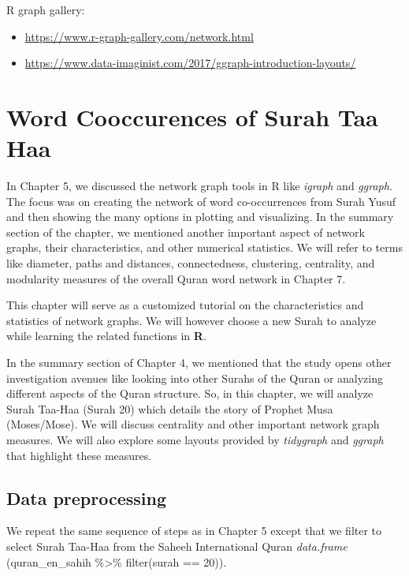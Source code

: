 \documentclass[
]{article}
\providecommand{\tightlist}{%
  \setlength{\itemsep}{0pt}\setlength{\parskip}{0pt}}
\begin{document}
R graph gallery:

\begin{itemize}
\tightlist
\item
  \url{https://www.r-graph-gallery.com/network.html}
\item
  \url{https://www.data-imaginist.com/2017/ggraph-introduction-layouts/}
\end{itemize}

\hypertarget{word-coccurrences-of-Surah-Taa-Haa}{%
\section{Word Cooccurences of Surah Taa Haa}\label{word-coccurrences-of-Surah-Taa-Haa}}

In Chapter 5, we discussed the network graph tools in R like \emph{igraph} and \emph{ggraph}. The focus was on creating the network of word co-occurrences from Surah Yusuf and then showing the many options in plotting and visualizing. In the summary section of the chapter, we mentioned another important aspect of network graphs, their characteristics, and other numerical statistics. We will refer to terms like diameter, paths and distances, connectedness, clustering, centrality, and modularity measures of the overall Quran word network in Chapter 7.

This chapter will serve as a customized tutorial on the characteristics and statistics of network graphs. We will however choose a new Surah to analyze while learning the related functions in \textbf{R}.

In the summary section of Chapter 4, we mentioned that the study opens other investigation avenues like looking into other Surahs of the Quran or analyzing different aspects of the Quran structure. So, in this chapter, we will analyze Surah Taa-Haa (Surah 20) which details the story of Prophet Musa (Moses/Mose). We will discuss centrality and other important network graph measures. We will also explore some layouts provided by \emph{tidygraph} and \emph{ggraph} that highlight these measures.

\hypertarget{data-preprocessing}{%
\subsection{Data preprocessing}\label{data-preprocessing}}

We repeat the same sequence of steps as in Chapter 5 except that we filter to select Surah Taa-Haa from the Saheeh International Quran \emph{data.frame} (quran\_en\_sahih \%\textgreater\% filter(surah == 20)).
\end{document}
